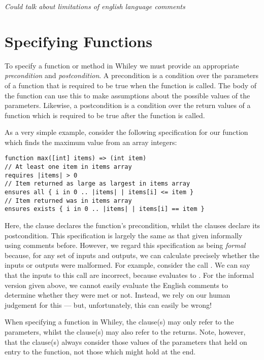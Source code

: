 {\em Could talk about limitations of english language comments}

\section{Specifying Functions}
To specify a function or method in Whiley we must provide an appropriate {\em precondition} and {\em postcondition}.  A precondition is a condition over the parameters of a function that is required to be true when the function is called.  The body of the function can use this to make assumptions about the possible values of the parameters.  Likewise, a postcondition is a condition over the return values of a function which is required to be true after the function is called.  

\begin{eg}
As a very simple example, consider the following specification for our function which finds the maximum value from an array integers:
\begin{tcolorbox}\begin{lstlisting}[language=Whiley]
function max([int] items) => (int item) 
// At least one item in items array
requires |items| > 0
// Item returned as large as largest in items array
ensures all { i in 0 .. |items| | items[i] <= item }
// Item returned was in items array
ensures exists { i in 0 .. |items| | items[i] == item }
\end{lstlisting}\end{tcolorbox}
Here, the  clause declares the function's precondition, whilst the  clauses declare its postcondition.  This specification is largely the same as that given informally using comments before.  However, we regard this specification as being {\em formal} because, for any set of inputs and outputs, we can calculate precisely whether the inputs or outputs were malformed.  For example, consider the call .  We can say that the inputs to this call are incorrect, because  evaluates to .  For the informal version given above, we cannot easily evaluate the English comments to determine whether they were met or not.  Instead, we rely on our human judgement for this --- but, unfortunately, this can easily be wrong!
\end{eg}

When specifying a function in Whiley, the  clause(s) may only refer to the parameters, whilst the  clause(s) may also refer to the returns.  Note, however, that the  clause(s) always consider those values of the parameters that held on entry to the function, not those which might hold at the end.

